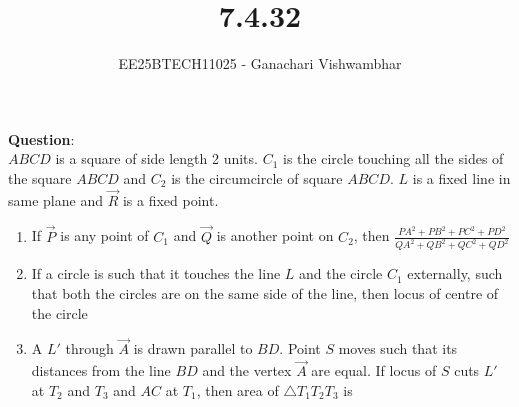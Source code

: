 \documentclass[journal]{IEEEtran}
\begin{document}
\title{7.4.32}
\author{EE25BTECH11025 - Ganachari Vishwambhar}
\maketitle

\textbf{Question}:\\
$ABCD$ is a square of side length 2 units. $C_1$ is the circle touching all the sides of the square $ABCD$ and $C_2$ is the circumcircle of square $ABCD$. $L$ is a fixed line in same plane and $\vec{R}$ is a fixed point.\\
\begin{enumerate}
    \item If $\vec{P}$ is any point of $C_1$ and $\vec{Q}$ is another point on $C_2$, then $\frac{PA^2+PB^2+PC^2+PD^2}{QA^2+QB^2+QC^2+QD^2}$
    \begin{enumerate}
    \end{enumerate}
    \item If a circle is such that it touches the line $L$ and the circle $C_1$ externally, such that both the circles are on the same side of the line, then locus of centre of the circle
    \begin{enumerate}
    \end{enumerate}
    \item A $L'$ through $\vec{A}$ is drawn parallel to $BD$. Point $S$ moves such that its distances from the line $BD$ and the vertex $\vec{A}$ are equal. If locus of $S$ cuts $L'$ at $T_2$ and $T_3$ and $AC$ at $T_1$, then area of $\triangle T_1T_2T_3$ is
    \begin{enumerate}
    \end{enumerate}
\end{enumerate}
\end{document}

